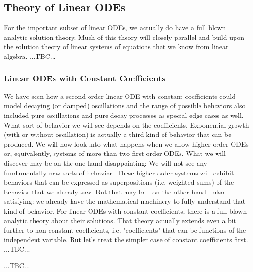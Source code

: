 \subsection{Theory of Linear ODEs}
For the important subset of linear ODEs, we actually do have a full blown analytic solution theory. Much of this theory will closely parallel and build upon the solution theory of linear systems of equations that we know from linear algebra. ...TBC...






\subsubsection{Linear ODEs with Constant Coefficients}
We have seen how a second order linear ODE with constant coefficients could model decaying (or damped) oscillations and the range of possible behaviors also included pure oscillations and pure decay processes as special edge cases as well. What sort of behavior we will see depends on the coefficients. Exponential growth (with or without oscillation) is actually a third kind of behavior that can be produced. We will now look into what happens when we allow higher order ODEs or, equivalently, systems of more than two first order ODEs. What we will discover may be on the one hand disappointing: We will not see any fundamentally new sorts of behavior. These higher order systems will exhibit behaviors that can be expressed as superpositions (i.e. weighted sums) of the behavior that we already saw. But that may be - on the other hand - also satisfying: we already have the mathematical machinery to fully understand that kind of behavior. For linear ODEs with constant coefficients, there is a full blown analytic theory about their solutions. That theory actually extends even a bit further to non-constant coefficients, i.e. "coefficients" that can be functions of the independent variable. But let's treat the simpler case of constant coefficients first. ...TBC...

...TBC...





